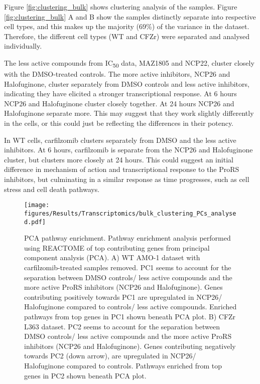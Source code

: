 Figure \ref{fig:clustering_bulk} shows clustering analysis of the samples.
Figure \ref{fig:clustering_bulk} A and B show the samples distinctly separate into respective cell types, and this makes up the majority (69\%) of the variance in the dataset.
Therefore, the different cell types (WT and CFZr) were separated and analysed individually.

The less active compounds from IC\textsubscript{50} data, MAZ1805 and NCP22, cluster closely with the DMSO-treated controls.
The more active inhibitors, NCP26 and Halofuginone, cluster separately from DMSO controls and less active inhibitors, indicating they have elicited a stronger transcriptional response.
At 6 hours NCP26 and Halofuginone cluster closely together.
At 24 hours NCP26 and Halofuginone separate more.
This may suggest that they work slightly differently in the cells, or this could just be reflecting the differences in their potency.

In WT cells, carfilzomib clusters separately from DMSO and the less active inhibitors.
At 6 hours, carfilzomib is separate from the NCP26 and Halofuginone cluster, but clusters more closely at 24 hours.
This could suggest an initial difference in mechanism of action and transcriptional response to the ProRS inhibitors, but culminating in a similar response as time progresses, such as cell stress and cell death pathways.

\begin{figure}[htb]
\centering
\texttt{[image: figures/Results/Transcriptomics/bulk\_clustering\_PCs\_analysed.pdf]}
\caption[PCA pathway enrichment]{PCA pathway enrichment.
Pathway enrichment analysis performed using REACTOME of top contributing genes from principal component analysis (PCA).
A) WT AMO-1 dataset with carfilzomib-treated samples removed.
PC1 seems to account for the separation between DMSO controls/ less active compounds and the more active ProRS inhibitors (NCP26 and Halofuginone).
Genes contributing positively towards PC1 are upregulated in NCP26/ Halofuginone compared to controls/ less active compounds.
Enriched pathways from top genes in PC1 shown beneath PCA plot.
B) CFZr L363 dataset.
PC2 seems to account for the separation between DMSO controls/ less active compounds and the more active ProRS inhibitors (NCP26 and Halofuginone).
Genes contributing negatively towards PC2 (down arrow), are upregulated in NCP26/ Halofuginone compared to controls.
Pathways enriched from top genes in PC2 shown beneath PCA plot.}
\label{fig:pca_pathway}
\end{figure}

